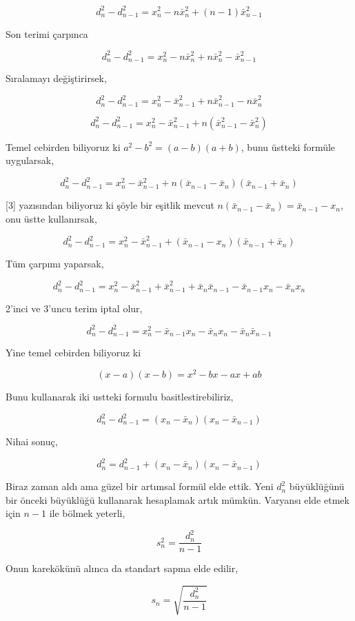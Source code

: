 \documentclass[12pt,fleqn]{article}\usepackage{../../common}
\begin{document}
$$
d_n^2 - d_{n-1}^2 = x_n^2 - n \bar{x}_n^2 + (n-1) \bar{x}_{n-1}^2
$$

Son terimi çarpınca

$$
d_n^2 - d_{n-1}^2 = x_n^2 - n \bar{x}_n^2 + n \bar{x}_n^2 - \bar{x}_{n-1}^2
$$

Sıralamayı değiştirirsek,

$$
d_n^2 - d_{n-1}^2 = x_n^2  - \bar{x}_{n-1}^2 + n \bar{x}_{n-1}^2 - n \bar{x}_n^2
$$

$$
d_n^2 - d_{n-1}^2 = x_n^2  - \bar{x}_{n-1}^2 + n (\bar{x}_{n-1}^2 - \bar{x}_n^2)
$$

Temel cebirden biliyoruz ki $a^2-b^2 = (a-b)(a+b)$, bunu üstteki formüle
uygularsak,

$$
d_n^2 - d_{n-1}^2 =
x_n^2  -
\bar{x}_{n-1}^2 +
n (\bar{x}_{n-1} - \bar{x}_n) (\bar{x}_{n-1} + \bar{x}_n) 
$$

[3] yazısından biliyoruz ki şöyle bir eşitlik mevcut $n (\bar{x}_{n-1} - \bar{x}_n) = \bar{x}_{n-1} - x_n$,
onu üstte kullanırsak,

$$
d_n^2 - d_{n-1}^2 = x_n^2  - \bar{x}_{n-1}^2 +  (\bar{x}_{n-1} - x_n) (\bar{x}_{n-1} + \bar{x}_n) 
$$

Tüm çarpımı yaparsak,

$$
d_n^2 - d_{n-1}^2 =
x_n^2 -
\bar{x}_{n-1}^2  +
\bar{x}_{n-1}^2 +
\bar{x}_n \bar{x}_{n-1} -
\bar{x}_{n-1} x_n -
\bar{x}_n x_n
$$

2'inci ve 3'uncu terim iptal olur,

$$
d_n^2 - d_{n-1}^2 =
x_n^2 -
\bar{x}_{n-1} x_n -
\bar{x}_n x_n -
\bar{x}_n \bar{x}_{n-1}
$$

Yine temel cebirden biliyoruz ki

$$
(x-a)(x-b) = x^2 - bx - ax + ab
$$

Bunu kullanarak iki ustteki formulu basitlestirebiliriz,

$$
d_n^2 - d_{n-1}^2 = (x_n - \bar{x}_n)(x_n - \bar{x}_{n-1} )
$$

Nihai sonuç,

$$
d_n^2 = d_{n-1}^2 + (x_n - \bar{x}_n)(x_n - \bar{x}_{n-1} )
$$

Biraz zaman aldı ama güzel bir artımsal formül elde ettik. Yeni $d_n^2$
büyüklüğünü bir önceki büyüklüğü kullanarak hesaplamak artık mümkün. 
Varyansı elde etmek için $n-1$ ile bölmek yeterli,

$$
s_n^2 = \frac{d_n^2}{n-1}
$$

Onun karekökünü alınca da standart sapma elde edilir,

$$
s_n = \sqrt{\frac{d_n^2}{n-1}}
$$
\end{document}
